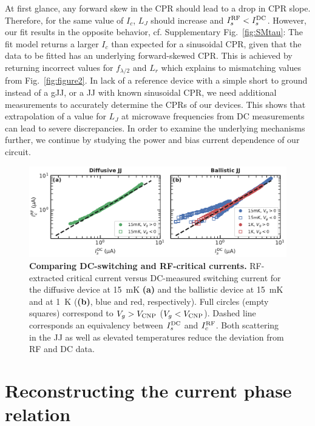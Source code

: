 At first glance, any forward skew in the CPR should lead to a drop in CPR slope.
%
Therefore, for the same value of $I_c$, $L_J$ should increase and $I_s^{\rm RF}<I_s^{\rm DC}$.
%
However, our fit results in the opposite behavior, cf. Supplementary Fig.~\ref{fig:SMtau}:
%
The fit model returns a larger $I_c$ than expected for a sinusoidal CPR, given that the data to be fitted has an underlying forward-skewed CPR.
%
This is achieved by returning incorrect values for $f_{\lambda/2}$ and $L_r$ which explains to mismatching values from Fig.~\ref{fig:figure2}.
%
In lack of a reference device with a simple short to ground instead of a gJJ, or a JJ with known sinusoidal CPR, we need additional measurements to accurately determine the CPRs of our devices.
%
This shows that extrapolation of a value for $L_J$ at microwave frequencies from DC measurements can lead to severe discrepancies.
%
In order to examine the underlying mechanisms further, we continue by studying the power and bias current dependence of our circuit.

\begin{figure}[t]
	\centering
	\includegraphics[width=\linewidth]{chapter-gJJ-CPR/figs/Figure3}
	\caption{
		\textbf{Comparing DC-switching and RF-critical currents.}
		RF-extracted critical current versus DC-measured switching current for the diffusive device at \SI{15}{\milli\kelvin} \textbf{(a)} and the ballistic device at \SI{15}{\milli\kelvin} and at \SI{1}{\kelvin} (\textbf{(b)}, blue and red, respectively).
		Full circles (empty squares) correspond to $V_g>V_{\rm CNP}$ ($V_g<V_{\rm CNP}$).
		Dashed line corresponds an equivalency between $I_s^{\rm DC}$ and $I_c^{\rm RF}$.
		Both scattering in the JJ as well as elevated temperatures reduce the deviation from RF and DC data.
	}
	\label{fig:figure3}
\end{figure}

\section{Reconstructing the current phase relation}

